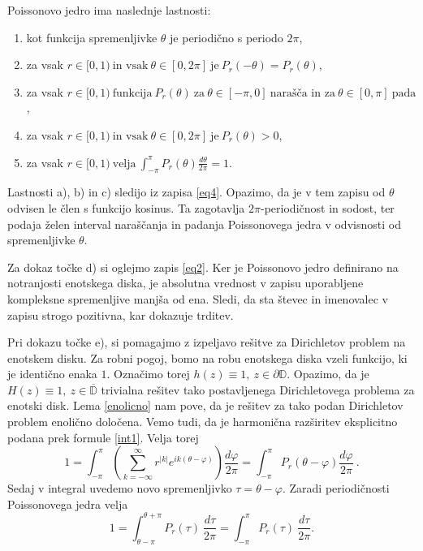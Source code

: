 \documentclass[mat1, tisk]{fmfdelo}
\begin{document}
    \begin{trditev}
        \label{lastpk}
        Poissonovo jedro ima naslednje lastnosti:
        \begin{enumerate}[label={\alph*)}]
            \item kot funkcija spremenljivke $\theta$ je periodično s periodo $2\pi$, 
            \item za vsak $r \in [0,1)~\text{in vsak}~\theta \in [0,2\pi]~\text{je}~P_r(-\theta) = P_r(\theta)$,
            \item za vsak $r \in [0,1)~\text{funkcija}~P_r(\theta)~\text{za}~\theta \in [-\pi, 0 ]~\text{narašča in za}~\theta \in [0, \pi ]~\text{pada}$,
            \item za vsak $r \in [0,1)~\text{in vsak}~\theta\in [0,2\pi]~\text{je}~P_r(\theta) > 0$,
            \item za vsak $r \in [0,1)~\text{velja}~\int_{-\pi}^{\pi}{P_r(\theta) \frac{d\theta}{2\pi}} = 1$.
        \end{enumerate}
    \end{trditev}
    \begin{dokaz}
        Lastnosti a), b) in c) sledijo iz zapisa \eqref{eq4}. Opazimo, da je v tem zapisu od $\theta$ odvisen le člen s funkcijo kosinus. 
        Ta zagotavlja $2\pi$-periodičnost in sodost, ter podaja želen interval naraščanja in padanja Poissonovega jedra v odvisnosti od spremenljivke $\theta$. 
        
        Za dokaz točke d) si oglejmo zapis \eqref{eq2}. Ker je Poissonovo jedro definirano na notranjosti enotskega diska, je absolutna vrednost v zapisu uporabljene kompleksne spremenljive manjša od ena. 
        Sledi, da sta števec in imenovalec v zapisu strogo pozitivna, kar dokazuje trditev. 

        Pri dokazu točke e), si pomagajmo z izpeljavo rešitve za Dirichletov problem na enotskem disku. 
        Za robni pogoj, bomo na robu enotskega diska vzeli funkcijo, ki je identično enaka $1$. Označimo torej $h(z) \equiv 1,~ z \in \partial \mathbb{D}$. Opazimo, da je \mbox{$H(z) \equiv 1,~z \in \overline{\mathbb{D}}$} trivialna rešitev tako postavljenega Dirichletovega problema za enotski disk.
        Lema \ref{enolicno} nam pove, da je rešitev za tako podan Dirichletov problem enolično določena. Vemo tudi, da je harmonična razširitev eksplicitno podana prek formule \eqref{int1}.
        Velja torej
        $$
        1 = \int_{-\pi}^{\pi}{\left(\sum_{k=-\infty}^{\infty}{r^{|k|} e^{ik(\theta - \varphi)}}\right) \frac{d \varphi}{2 \pi}} = \int_{-\pi}^{\pi}{P_r(\theta - \varphi)\frac{d \varphi}{2 \pi}}~. 
        $$
        Sedaj v integral uvedemo novo spremenljivko $\tau = \theta - \varphi$. Zaradi periodičnosti Poissonovega jedra velja 
        $$
        1 = \int_{\theta - \pi}^{\theta + \pi}{P_r(\tau)~\frac{d \tau}{2 \pi}} = \int_{-\pi}^{\pi}{P_r(\tau)~\frac{d \tau}{2 \pi}}.
        $$
    \end{dokaz}
\end{document}
